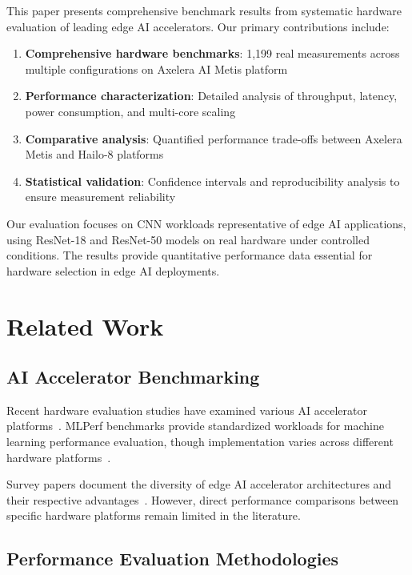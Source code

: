 \documentclass[12pt,draftcls,onecolumn]{IEEEtran}
\begin{document}
This paper presents comprehensive benchmark results from systematic hardware evaluation of leading edge AI accelerators. Our primary contributions include:

\begin{enumerate}
    \item \textbf{Comprehensive hardware benchmarks}: 1,199 real measurements across multiple configurations on Axelera AI Metis platform
    \item \textbf{Performance characterization}: Detailed analysis of throughput, latency, power consumption, and multi-core scaling
    \item \textbf{Comparative analysis}: Quantified performance trade-offs between Axelera Metis and Hailo-8 platforms
    \item \textbf{Statistical validation}: Confidence intervals and reproducibility analysis to ensure measurement reliability
\end{enumerate}

Our evaluation focuses on CNN workloads representative of edge AI applications, using ResNet-18 and ResNet-50 models on real hardware under controlled conditions. The results provide quantitative performance data essential for hardware selection in edge AI deployments.

\section{Related Work}

\subsection{AI Accelerator Benchmarking}

Recent hardware evaluation studies have examined various AI accelerator platforms~\cite{benchmarking_edge2024}. MLPerf benchmarks provide standardized workloads for machine learning performance evaluation, though implementation varies across different hardware platforms~\cite{isca_benchmark2020}.

Survey papers document the diversity of edge AI accelerator architectures and their respective advantages~\cite{optimization_survey2025}. However, direct performance comparisons between specific hardware platforms remain limited in the literature.

\subsection{Performance Evaluation Methodologies}
\end{document}

